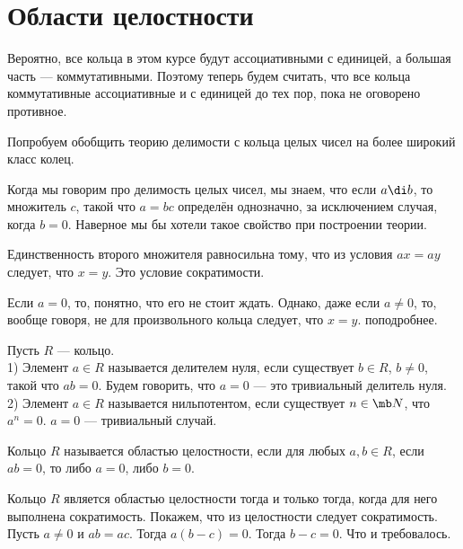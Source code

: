 \section{Области целостности}

\rm Вероятно, все кольца в этом курсе будут ассоциативными с единицей, а большая часть --- коммутативными. Поэтому теперь будем считать, что все кольца коммутативные ассоциативные и с единицей до тех пор, пока не оговорено противное.
\erm

Попробуем обобщить теорию делимости с кольца целых чисел на более широкий класс колец.

Когда мы говорим про делимость целых чисел, мы знаем, что если $a\di b$, то множитель $c$, такой что $a=bc$ определён однозначно, за исключением случая, когда $b=0$. Наверное мы бы хотели такое свойство при построении теории. 

Единственность второго множителя равносильна тому, что из условия $ax=ay$ следует, что $x=y$. Это условие сократимости.

Если $a=0$, то, понятно, что его не стоит ждать. Однако, даже если $a\neq 0$, то, вообще говоря, не для произвольного кольца  следует, что $x=y$. поподробнее.

 Пусть $R$ --- кольцо.\\
1) Элемент $a\in R$ называется делителем нуля, если существует $b\in R$, $b\neq 0$, такой что $ab=0$. Будем говорить, что
$a=0$ --- это тривиальный делитель нуля.\\
2) Элемент $a\in R$ называется нильпотентом, если существует $n\in \mb N$, что $a^n= 0$. $a= 0$ --- тривиальный случай.
\edfn

 Кольцо $R$ называется областью целостности, если для любых $a,b\in R$,
если $ab=0$, то либо $a = 0$, либо $b= 0$.
\edfn

\lm Кольцо $R$ является областью целостности тогда и только тогда, когда для него выполнена сократимость.
\proof Покажем, что из целостности следует сократимость. Пусть $a\neq 0$ и $ab=ac$. Тогда $a(b-c)=0$. Тогда $b-c=0$. Что и требовалось.
\endproof
\elm


